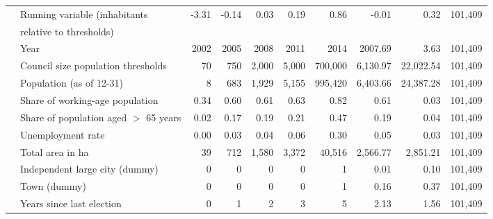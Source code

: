 \begin{tabular}{llrrrrrrrr}
  &Running variable (inhabitants & -3.31 & -0.14 & 0.03 & 0.19 & 0.86 & -0.01 & 0.32 & 101,409 \\ 
  &\hspace{5mm} relative to thresholds) & & & & & & & & \\
  &Year & 2002 & 2005 & 2008 & 2011 & 2014 & 2007.69 & 3.63 & 101,409 \\ 
  &Council size population thresholds & 70 & 750 & 2,000 & 5,000 & 700,000 & 6,130.97 & 22,022.54 & 101,409 \\ 
  &Population (as of 12-31) & 8 & 683 & 1,929 & 5,155 & 995,420 & 6,403.66 & 24,387.28 & 101,409 \\ 
  &Share of working-age population & 0.34 & 0.60 & 0.61 & 0.63 & 0.82 & 0.61 & 0.03 & 101,409 \\ 
  &Share of population aged $>$ 65 years & 0.02 & 0.17 & 0.19 & 0.21 & 0.47 & 0.19 & 0.04 & 101,409 \\ 
  &Unemployment rate & 0.00 & 0.03 & 0.04 & 0.06 & 0.30 & 0.05 & 0.03 & 101,409 \\ 
  &Total area in ha & 39 & 712 & 1,580 & 3,372 & 40,516 & 2,566.77 & 2,851.21 & 101,409 \\ 
  &Independent large city (dummy) & 0 & 0 & 0 & 0 & 1 & 0.01 & 0.10 & 101,409 \\ 
  &Town (dummy) & 0 & 0 & 0 & 0 & 1 & 0.16 & 0.37 & 101,409 \\ 
  &Years since last election & 0 & 1 & 2 & 3 & 5 & 2.13 & 1.56 & 101,409 \\
  
  
  

\end{tabular}
